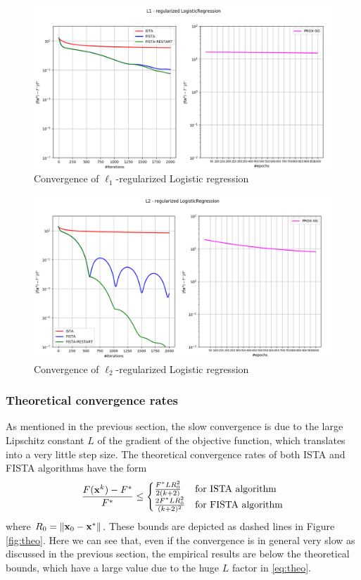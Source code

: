 \documentclass{article}
\begin{document}
\begin{figure}[ht]
    \centering
    \includegraphics[trim={2.5cm 0.5cm 3cm 0},clip, width=.9\textwidth]{img/convergence_l1.png}
    \caption{Convergence of $\ell_1$-regularized Logistic regression}
    \label{fig:conv_l1}
\end{figure}
\begin{figure}[ht]
    \centering
    \includegraphics[trim={2.5cm 0.5cm 3cm 0},clip, width=.9\textwidth]{img/convergence_l2.png}
    \caption{Convergence of $\ell_2$-regularized Logistic regression}
    \label{fig:conv_l2}
\end{figure}

\subsubsection*{Theoretical convergence rates}
As mentioned in the previous section, the slow convergence is due to the large Lipschitz constant $L$ of the gradient of the objective function, which translates into a very little step size. The theoretical convergence rates of both ISTA and FISTA algorithms have the form
\begin{align}
    \frac{F(\mathbf{x}^k) - F^*}{F^*} \leq 
    \begin{cases}
        \frac{F^* L R_0^2}{2(k+2)} &\text{for ISTA algorithm} \\
        \frac{2 F^* L R_0^2}{(k+2)^2} &\text{for FISTA algorithm}
    \end{cases}
    \label{eq:theo}
\end{align}
where $R_0 = \left\lVert\mathbf{x}_0 - \mathbf{x}^*\right\rVert$. These bounds are depicted as dashed lines in Figure \ref{fig:theo}. Here we can see that, even if the convergence is in general very slow as discussed in the previous section, the empirical results are below the theoretical bounds, which have a large value due to the huge $L$ factor in \eqref{eq:theo}.
\end{document}
